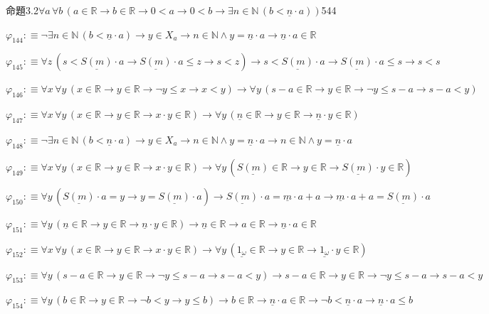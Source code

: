 \begin{fullproof}{命題3.2}{$\forall a\,\forall b\,(a \in \mathbb{R} \to b \in \mathbb{R} \to 0 < a \to 0 < b \to \exists n \in \mathbb{N}\,(b < \underline{n} \cdot a))$}{544}
\begin{abbrevlist}
\item $\varphi_{144} :\equiv \neg \exists n \in \mathbb{N}\,(b < \underline{n} \cdot a) \to y \in X_{a} \to n \in \mathbb{N} \land y = \underline{n} \cdot a \to \underline{n} \cdot a \in \mathbb{R}$
\item $\varphi_{145} :\equiv \forall z\,(s < \underline{S(m)} \cdot a \to \underline{S(m)} \cdot a \leq z \to s < z) \to s < \underline{S(m)} \cdot a \to \underline{S(m)} \cdot a \leq s \to s < s$
\item $\varphi_{146} :\equiv \forall x\,\forall y\,(x \in \mathbb{R} \to y \in \mathbb{R} \to \neg y \leq x \to x < y) \to \forall y\,(s - a \in \mathbb{R} \to y \in \mathbb{R} \to \neg y \leq s - a \to s - a < y)$
\item $\varphi_{147} :\equiv \forall x\,\forall y\,(x \in \mathbb{R} \to y \in \mathbb{R} \to x \cdot y \in \mathbb{R}) \to \forall y\,(\underline{n} \in \mathbb{R} \to y \in \mathbb{R} \to \underline{n} \cdot y \in \mathbb{R})$
\item $\varphi_{148} :\equiv \neg \exists n \in \mathbb{N}\,(b < \underline{n} \cdot a) \to y \in X_{a} \to n \in \mathbb{N} \land y = \underline{n} \cdot a \to n \in \mathbb{N} \land y = \underline{n} \cdot a$
\item $\varphi_{149} :\equiv \forall x\,\forall y\,(x \in \mathbb{R} \to y \in \mathbb{R} \to x \cdot y \in \mathbb{R}) \to \forall y\,(\underline{S(m)} \in \mathbb{R} \to y \in \mathbb{R} \to \underline{S(m)} \cdot y \in \mathbb{R})$
\item $\varphi_{150} :\equiv \forall y\,(\underline{S(m)} \cdot a = y \to y = \underline{S(m)} \cdot a) \to \underline{S(m)} \cdot a = \underline{m} \cdot a + a \to \underline{m} \cdot a + a = \underline{S(m)} \cdot a$
\item $\varphi_{151} :\equiv \forall y\,(\underline{n} \in \mathbb{R} \to y \in \mathbb{R} \to \underline{n} \cdot y \in \mathbb{R}) \to \underline{n} \in \mathbb{R} \to a \in \mathbb{R} \to \underline{n} \cdot a \in \mathbb{R}$
\item $\varphi_{152} :\equiv \forall x\,\forall y\,(x \in \mathbb{R} \to y \in \mathbb{R} \to x \cdot y \in \mathbb{R}) \to \forall y\,(\underline{1_{\omega}} \in \mathbb{R} \to y \in \mathbb{R} \to \underline{1_{\omega}} \cdot y \in \mathbb{R})$
\item $\varphi_{153} :\equiv \forall y\,(s - a \in \mathbb{R} \to y \in \mathbb{R} \to \neg y \leq s - a \to s - a < y) \to s - a \in \mathbb{R} \to y \in \mathbb{R} \to \neg y \leq s - a \to s - a < y$
\item $\varphi_{154} :\equiv \forall y\,(b \in \mathbb{R} \to y \in \mathbb{R} \to \neg b < y \to y \leq b) \to b \in \mathbb{R} \to \underline{n} \cdot a \in \mathbb{R} \to \neg b < \underline{n} \cdot a \to \underline{n} \cdot a \leq b$

\end{abbrevlist}
\end{fullproof}
